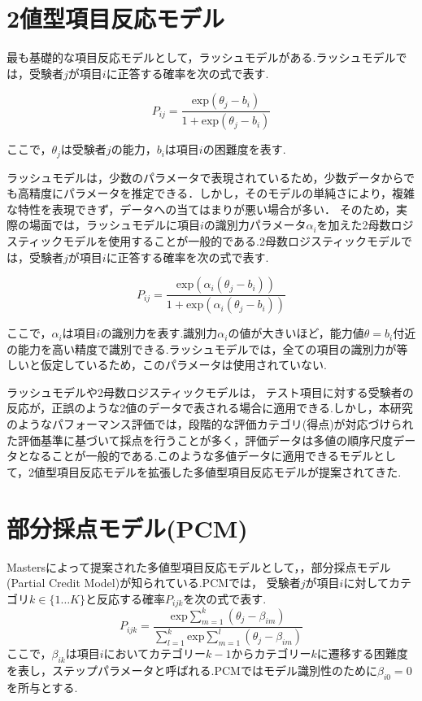 \documentclass[a4paper,11pt,oneside,openany]{jsbook}
\begin{document}
\section{2値型項目反応モデル}
最も基礎的な項目反応モデルとして，ラッシュモデル\cite{rash}がある.ラッシュモデルでは，受験者$j$が項目$i$に正答する確率を次の式で表す.

\begin{displaymath}
P_{ij} = \frac{\mathrm{exp}(\theta_{j}-b_{i})}{1 + \mathrm{exp}(\theta_{j}-b_{i})}
\end{displaymath}

ここで，$\theta_{j}$は受験者$j$の能力，$b_{i}$は項目$i$の困難度を表す.

ラッシュモデルは，少数のパラメータで表現されているため，少数データからでも高精度にパラメータを推定できる\cite{rashbenefit}．しかし，そのモデルの単純さにより，複雑な特性を表現できず，データへの当てはまりが悪い場合が多い\cite{rashloss}．
そのため，実際の場面では，ラッシュモデルに項目$i$の識別力パラメータ$\alpha_{i}$を加えた2母数ロジスティックモデルを使用することが一般的である.2母数ロジスティックモデルでは，受験者$j$が項目$i$に正答する確率を次の式で表す.

\begin{displaymath}
  P_{ij} = \frac{\mathrm{exp}(\alpha_{i}(\theta_{j}-b_{i}))}{1 + \mathrm{exp}(\alpha_{i}(\theta_{j}-b_{i}))}
  \end{displaymath}
  
ここで，$\alpha_{i}$は項目$i$の識別力を表す.識別力$\alpha_{i}$の値が大きいほど，能力値$\theta = b_i$付近の能力を高い精度で識別できる.ラッシュモデルでは，全ての項目の識別力が等しいと仮定しているため，このパラメータは使用されていない.

ラッシュモデルや2母数ロジスティックモデルは， テスト項目に対する受験者の反応が，正誤のような2値のデータで表される場合に適用できる.しかし，本研究のようなパフォーマンス評価では，段階的な評価カテゴリ(得点)が対応づけられた評価基準に基づいて採点を行うことが多く，評価データは多値の順序尺度データとなることが一般的である.このような多値データに適用できるモデルとして，2値型項目反応モデルを拡張した多値型項目反応モデルが提案されてきた.


\section{部分採点モデル(PCM)}
Mastersによって提案された多値型項目反応モデルとして，，部分採点モデル(Partial Credit Model)\cite{PCM}が知られている.PCMでは， 受験者$j$が項目$i$に対してカテゴリ$k \in \{1\dots K\}$と反応する確率$P_{ijk}$を次の式で表す.
\begin{displaymath}
P_{ijk} = \frac{\mathrm{exp}\sum_{m=1}^{k}(\theta_{j}-\beta_{im})}{\sum_{l=1}^{k} \mathrm{exp}\sum_{m=1}^{l}(\theta_{j}-\beta_{im})}
\end{displaymath}
ここで，$\beta_{ik}$は項目$i$においてカテゴリー$k-1$からカテゴリー$k$に遷移する困難度を表し，ステップパラメータと呼ばれる.PCMではモデル識別性のために$\beta_{i0}=0$を所与とする.
\end{document}
